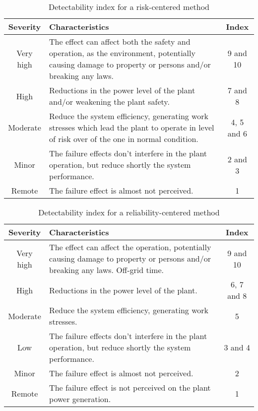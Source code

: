 \begin{table}[!htb]
    \centering
        \begin{tabular}{ cp{10cm}c }
        \hline
        Severity & Characteristics & Index \\ \hline\hline
        Very high  & The effect can affect both the safety and operation, as the environment, potentially causing damage to property or persons and/or breaking any laws.  & 9 and 10 \\
        High       & Reductions in the power level of the plant and/or weakening the plant safety.  & 7 and 8 \\
        Moderate   & Reduce the system efficiency, generating work stresses which lead the plant to operate in level of risk over of the one in normal condition.  & 4, 5 and 6 \\
        Minor      & The failure effects don’t interfere in the plant operation, but reduce shortly the system performance.  & 2 and 3 \\
        Remote     & The failure effect is almost not perceived.  & 1 \\
                                     
        \end{tabular}
        \caption{Detectability index for a risk-centered method}\label{tab:severity_risk}
\end{table}

\begin{table}[!htb]
    \centering
        \begin{tabular}{ cp{10cm}c }
        \hline
        Severity & Characteristics & Index \\ \hline\hline
        Very high  & The effect can affect the operation, potentially causing damage to property or persons and/or breaking any laws. Off-grid time.  & 9 and 10 \\
        High       & Reductions in the power level of the plant.  & 6, 7 and 8 \\
        Moderate   & Reduce the system efficiency, generating work stresses.  & 5 \\
        Low        & The failure effects don’t interfere in the plant operation, but reduce shortly the system performance.  & 3 and 4 \\
        Minor      & The failure effect is almost not perceived.  & 2 \\
        Remote     & The failure effect is not perceived on the plant power generation.  & 1 \\
                                     
        \end{tabular}
        \caption{Detectability index for a reliability-centered method}\label{tab:severity_reliability}
\end{table}

